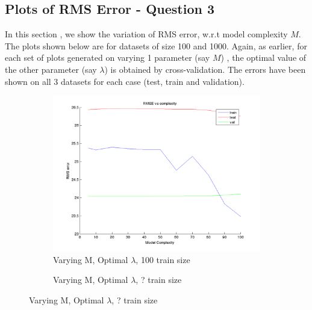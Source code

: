 \documentclass{article}
\begin{document}
\subsection{Plots of RMS Error - Question 3}

In this section , we show the variation of RMS error, w.r.t model complexity $M$. The plots shown below are for datasets of size 100 and 1000.
Again, as earlier, for each set of plots generated on varying 1 parameter (say $M$) , the optimal value of the other parameter (say $\lambda$) is obtained by cross-validation. 
The errors have been shown on all 3 datasets for each case (test, train and validation). 

\begin{figure}[H]

\begin{subfigure}{.5\textwidth}
\centering
\includegraphics[width=\linewidth]{D2/RMS_complexity_100}
\caption{Varying M, Optimal $\lambda$, 100 train size}
\end{subfigure}
\begin{subfigure}{.5\textwidth}
\caption{Varying M, Optimal $\lambda$, ? train size}
\end{subfigure}



\end{figure}
\end{document}
